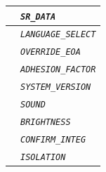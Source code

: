 \begin{itemize}
\begin{longtable}{|l|l|}
				\hline

				&	\begin{minipage}[t]{0.78\linewidth} \emph{\texttt{SR\_DATA}} \end{minipage} \\

				\hline

				&	\begin{minipage}[t]{0.78\linewidth} \emph{\texttt{LANGUAGE\_SELECT}} \end{minipage} \\

				\hline

				&	\begin{minipage}[t]{0.78\linewidth} \emph{\texttt{OVERRIDE\_EOA}} \end{minipage} \\

				\hline

				&	\begin{minipage}[t]{0.78\linewidth} \emph{\texttt{ADHESION\_FACTOR}} \end{minipage} \\

				\hline

				&	\begin{minipage}[t]{0.78\linewidth} \emph{\texttt{SYSTEM\_VERSION}} \end{minipage} \\

				\hline

				&	\begin{minipage}[t]{0.78\linewidth} \emph{\texttt{SOUND}} \end{minipage} \\

				\hline

				&	\begin{minipage}[t]{0.78\linewidth} \emph{\texttt{BRIGHTNESS}} \end{minipage} \\

				\hline

				&	\begin{minipage}[t]{0.78\linewidth} \emph{\texttt{CONFIRM\_INTEG}} \end{minipage} \\

				\hline

				&	\begin{minipage}[t]{0.78\linewidth} \emph{\texttt{ISOLATION}} \end{minipage} \\


\end{longtable}
\end{itemize}
